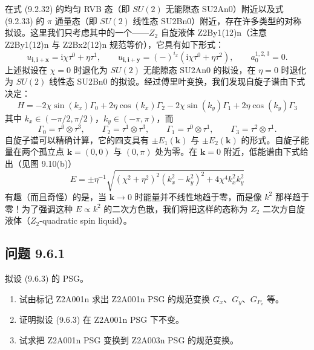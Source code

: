 在式 (9.2.32) 的均匀 RVB 态（即 $SU(2)$ 无能隙态 SU2An0）附近以及式 (9.2.33) 的 $\pi$ 通量态（即 $SU(2)$ 线性态 SU2Bn0）附近，存在许多类型的对称拟设。这里我们只考虑其中的一个——$Z_2$ 自旋液体 Z2By1(12)n（注意 Z2By1(12)n 与 Z2Bx2(12)n 规范等价），它具有如下形式：
\begin{equation*}
u_{\pmb{i},\pmb{i}+\pmb{x}}=\mathrm{i}\chi\tau^{0}+\eta\tau^{1},\qquad
u_{\pmb{i},\pmb{i}+\pmb{y}}=(-)^{i_x}(\mathrm{i}\chi\tau^{0}+\eta\tau^{2}),\qquad
a_0^{1,2,3}=0.
\tag{9.6.10}
\end{equation*}
上述拟设在 $\chi=0$ 时退化为 $SU(2)$ 无能隙态 SU2An0 的拟设，在 $\eta=0$ 时退化为 $SU(2)$ 线性态 SU2Bn0 的拟设。经过傅里叶变换，我们发现自旋子谱由下式决定：
\begin{equation*}
H=-2\chi\sin(k_x)\Gamma_0+2\eta\cos(k_x)\Gamma_2-2\chi\sin(k_y)\Gamma_1+2\eta\cos(k_y)\Gamma_3
\end{equation*}
其中 $k_x\in(-\pi/2,\pi/2)$，$k_y\in(-\pi,\pi)$，而
\begin{equation*}
\Gamma_0=\tau^{0}\otimes\tau^{3},\qquad
\Gamma_2=\tau^{1}\otimes\tau^{3},\qquad
\Gamma_1=\tau^{0}\otimes\tau^{1},\qquad
\Gamma_3=\tau^{2}\otimes\tau^{1}.
\end{equation*}
自旋子谱可以精确计算，它的四支具有 $\pm E_1(\pmb{k})$ 与 $\pm E_2(\pmb{k})$ 的形式。自旋子能量在两个孤立点 $\pmb{k}=(0,0)$ 与 $(0,\pi)$ 处为零。在 $\pmb{k}=0$ 附近，低能谱由下式给出（见图 9.10(b)）
\begin{equation*}
E=\pm\eta^{-1}\sqrt{(\chi^{2}+\eta^{2})^{2}(k_x^{2}-k_y^{2})^{2}+4\chi^{4}k_x^{2}k_y^{2}}
\end{equation*}
有趣（而且奇怪）的是，当 $\pmb{k}\to 0$ 时能量并不线性地趋于零，而是像 $k^{2}$ 那样趋于零！为了强调这种 $E\propto k^{2}$ 的二次方色散，我们将把这样的态称为 $Z_2$ 二次方自旋液体（$Z_2$-quadratic spin liquid）。

\subsection*{问题 9.6.1}

拟设 (9.6.3) 的 PSG。
\begin{enumerate}
\item 试由标记 Z2A001n 求出 Z2A001n PSG 的规范变换 $G_x$、$G_y$、$G_{P_x}$ 等。
\item 证明拟设 (9.6.3) 在 Z2A001n PSG 下不变。
\item 试求把 Z2A001n PSG 变换到 Z2A003n PSG 的规范变换。
\end{enumerate}

